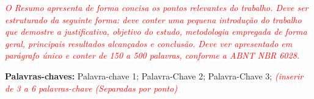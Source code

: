\setlength{\absparsep}{18pt}
\begin{resumo}
  \noindent
  
  \textit{\textcolor{red}{O Resumo apresenta de forma concisa os pontos relevantes do trabalho. Deve ser estruturado da seguinte forma:  deve conter uma pequena introdução do trabalho que demostre a justificativa, objetivo do estudo, metodologia empregada de forma geral, principais resultados alcançados e conclusão. Deve ver apresentado em parágrafo único e conter de 150 a 500 palavras, conforme a ABNT NBR 6028.}}
  
  \hfill \break
  \textbf{Palavras-chaves:} Palavra-chave 1; Palavra-Chave 2; Palavra-Chave 3; \textit{\textcolor{red}{(inserir de 3 a 6 palavras-chave (Separadas por ponto)}}
\end{resumo}

